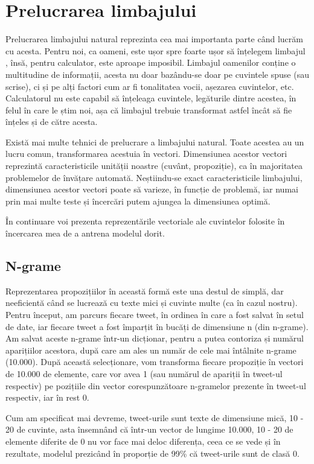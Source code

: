 \chapter{Prelucrarea limbajului}

Prelucrarea limbajului  natural reprezinta cea mai importanta parte când lucrăm 
cu acesta. Pentru noi, ca oameni, este ușor spre foarte ușor să înțelegem limbajul
, însă, pentru calculator, este aproape imposibil. Limbajul oamenilor conține o
multitudine de informații, acesta nu doar bazându-se doar pe cuvintele spuse (sau scrise),
ci și pe alți factori cum ar fi tonalitatea vocii, așezarea cuvintelor, etc. Calculatorul
nu este capabil să înțeleaga cuvintele, legăturile dintre acestea, în felul în care le 
știm noi, așa că limbajul trebuie transformat astfel încât să fie înțeles și de către acesta.

Există mai multe tehnici de prelucrare a limbajului natural. Toate acestea au un lucru comun,
transformarea acestuia în vectori. Dimensiunea acestor vectori reprezintă caracteristicile
unității noastre (cuvânt, propoziție), ca în majoritatea problemelor de învățare automată.
Neștiindu-se exact caracteristicile limbajului, dimensiunea acestor vectori poate să varieze,
în funcție de problemă, iar numai prin mai multe teste și încercări putem ajungea la dimensiunea
optimă.


În continuare voi prezenta reprezentările vectoriale ale cuvintelor folosite în încercarea mea
de a antrena modelul dorit. 

\section{N-grame}

Reprezentarea propozițiilor în această formă este una destul de simplă, dar neeficientă când se 
lucrează cu texte mici și cuvinte multe (ca în cazul nostru). Pentru început, am parcurs fiecare 
tweet, în ordinea în care a fost salvat în setul de date, iar fiecare tweet a fost împarțit în
bucăți de dimensiune n (din n-grame). Am salvat aceste n-grame într-un dicționar, pentru a putea
contoriza și numărul aparițiilor acestora, după care am ales un număr de cele mai întâlnite n-grame
(10.000). După această selecționare, vom transforma fiecare propoziție în vectori de 10.000 de elemente,
care vor avea 1 (sau numărul de apariții în tweet-ul respectiv) pe pozițiile din vector corespunzătoare n-gramelor prezente 
în tweet-ul respectiv, iar în rest 0.

Cum am specificat mai devreme, tweet-urile sunt texte de dimensiune mică, 10 - 20 de cuvinte, asta însemnând
că într-un vector de lungime 10.000, 10 - 20 de elemente diferite de 0 nu vor face mai deloc diferența, ceea
ce se vede și în rezultate, modelul prezicând în proporție de 99\% că tweet-urile sunt de clasă 0.

